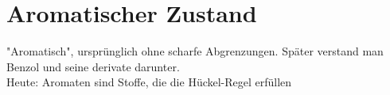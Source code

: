 \section{Aromatischer Zustand}
"Aromatisch", ursprünglich ohne scharfe Abgrenzungen.
Später verstand man Benzol und seine derivate darunter. \\
Heute: Aromaten sind Stoffe, die die Hückel-Regel erfüllen
